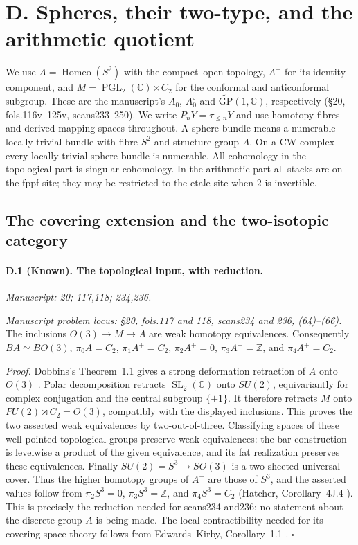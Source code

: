 \section{D. Spheres, their two-type, and the arithmetic quotient}
\label{sec:spheres}

We use $A=\operatorname{Homeo}(S^2)$ with the compact--open topology, $A^+$ for its identity component, and $M=\operatorname{PGL}_2(\mathbb C)\rtimes C_2$ for the conformal and anticonformal subgroup. These are the manuscript's $A_0$, $A_0^\circ$ and $\widetilde{\mathrm{GP}}(1,\mathbb C)$, respectively (\S20, fols.116v--125v, scans233--250). We write $P_nY=\tau_{\leq n}Y$ and use homotopy fibres and derived mapping spaces throughout. A sphere bundle means a numerable locally trivial bundle with fibre $S^2$ and structure group $A$. On a CW complex every locally trivial sphere bundle is numerable. All cohomology in the topological part is singular cohomology. In the arithmetic part all stacks are on the fppf site; they may be restricted to the etale site when $2$ is invertible.

\subsection{The covering extension and the two-isotopic category}

\paragraph{D.1 (Known). The topological input, with reduction.}
\textit{Manuscript: 20; 117,118; 234,236.}

\emph{Manuscript problem locus: \S20, fols.117 and 118, scans234 and 236, (64)--(66).}
The inclusions $O(3)\longrightarrow M\longrightarrow A$ are weak homotopy equivalences. Consequently $BA\simeq BO(3)$, $\pi_0A=C_2$, $\pi_1A^+=C_2$, $\pi_2A^+=0$, $\pi_3A^+=\mathbb Z$, and $\pi_4A^+=C_2$.

\emph{Proof.} Dobbins's Theorem~1.1 gives a strong deformation retraction of $A$ onto $O(3)$ \citep{Dobbins2021}. Polar decomposition retracts $\operatorname{SL}_2(\mathbb C)$ onto $SU(2)$, equivariantly for complex conjugation and the central subgroup $\{\pm1\}$. It therefore retracts $M$ onto $PU(2)\rtimes C_2=O(3)$, compatibly with the displayed inclusions. This proves the two asserted weak equivalences by two-out-of-three. Classifying spaces of these well-pointed topological groups preserve weak equivalences: the bar construction is levelwise a product of the given equivalence, and its fat realization preserves these equivalences. Finally $SU(2)=S^3\longrightarrow SO(3)$ is a two-sheeted universal cover. Thus the higher homotopy groups of $A^+$ are those of $S^3$, and the asserted values follow from $\pi_2S^3=0$, $\pi_3S^3=\mathbb Z$, and $\pi_4S^3=C_2$ (Hatcher, Corollary~4J.4 \citep{Hatcher2002}). This is precisely the reduction needed for scans234 and236; no statement about the discrete group $A$ is being made. The local contractibility needed for its covering-space theory follows from Edwards--Kirby, Corollary~1.1 \citep{EdwardsKirby1971}. \hfill$\square$

